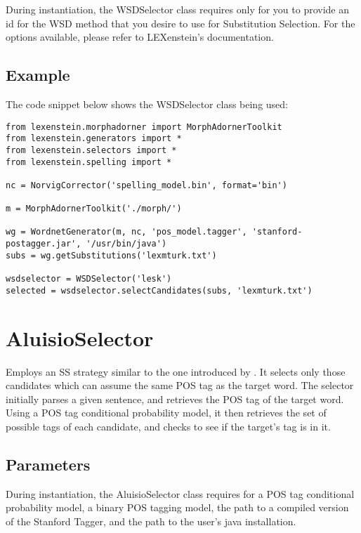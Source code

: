 During instantiation, the WSDSelector class requires only for you to provide an id for the WSD method that you desire to use for Substitution Selection. For the options available, please refer to LEXenstein's documentation.

\subsection{Example}

The code snippet below shows the WSDSelector class being used:

\begin{lstlisting}
from lexenstein.morphadorner import MorphAdornerToolkit
from lexenstein.generators import *
from lexenstein.selectors import *
from lexenstein.spelling import *

nc = NorvigCorrector('spelling_model.bin', format='bin')

m = MorphAdornerToolkit('./morph/')

wg = WordnetGenerator(m, nc, 'pos_model.tagger', 'stanford-postagger.jar', '/usr/bin/java')
subs = wg.getSubstitutions('lexmturk.txt')

wsdselector = WSDSelector('lesk')
selected = wsdselector.selectCandidates(subs, 'lexmturk.txt')
\end{lstlisting}
















\section{AluisioSelector}

Employs an SS strategy similar to the one introduced by \cite{Aluisio09}. It selects only those candidates which can assume the same POS tag as the target word. The selector initially parses a given sentence, and retrieves the POS tag of the target word. Using a POS tag conditional probability model, it then retrieves the set of possible tags of each candidate, and checks to see if the target's tag is in it.

\subsection{Parameters}

During instantiation, the AluisioSelector class requires for a POS tag conditional probability model, a binary POS tagging model, the path to a compiled version of the Stanford Tagger, and the path to the user's java installation.

